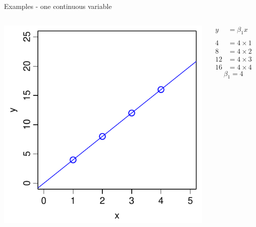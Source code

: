 \documentclass[xcolor=x11names,compress]{beamer}
\renewcommand{\(}{\begin{columns}}
\renewcommand{\)}{\end{columns}}
\newcommand{\<}[1]{\begin{column}{#1}}
\renewcommand{\>}{\end{column}}
\begin{document}

\begin{frame}{Examples - one continuous variable}

    \begin{columns}[T]
    
            \includegraphics[width=\textwidth]{Origin.pdf}
            
            \begin{align*}
              y  &=  \beta_1 x \\
              \\
              4  &=  4 \times 1 \\
              8  &=  4 \times 2 \\
              12 &=  4 \times 3 \\
              16 &=  4 \times 4   
            \end{align*}
            \[\beta_1 =4\]
    \end{columns}
    \end{frame}
    
\end{document}
